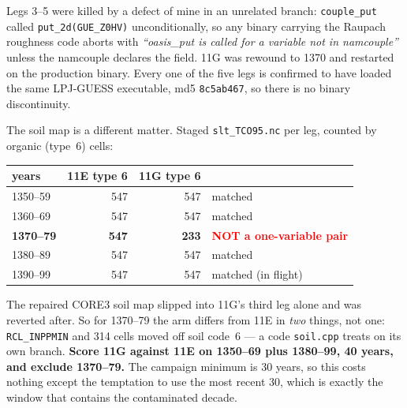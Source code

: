 \documentclass[10pt]{article}
\begin{document}
Legs 3--5 were killed by a defect of mine in an unrelated branch: \texttt{couple\_put}
called \texttt{put\_2d(GUE\_Z0HV)} unconditionally, so any binary carrying the Raupach
roughness code aborts with \emph{``oasis\_put is called for a variable not in
namcouple''} unless the namcouple declares the field. 11G was rewound to 1370 and
restarted on the production binary. Every one of the five legs is confirmed to have
loaded the same LPJ-GUESS executable, md5 \texttt{8c5ab467}, so there is no binary
discontinuity.

The soil map is a different matter. Staged \texttt{slt\_TCO95.nc} per leg, counted by
organic (type~6) cells:

\begin{center}\footnotesize
\begin{tabular}{l r r l}
\toprule
years & 11E type 6 & 11G type 6 & \\
\midrule
1350--59 & 547 & 547 & matched \\
1360--69 & 547 & 547 & matched \\
\textbf{1370--79} & \textbf{547} & \textbf{233} & \textcolor{red}{\textbf{NOT a one-variable pair}} \\
1380--89 & 547 & 547 & matched \\
1390--99 & 547 & 547 & matched (in flight) \\
\bottomrule
\end{tabular}
\end{center}

\noindent The repaired CORE3 soil map slipped into 11G's third leg alone and was reverted
after. So for 1370--79 the arm differs from 11E in \emph{two} things, not one:
\texttt{RCL\_INPPMIN} and 314 cells moved off soil code~6 --- a code \texttt{soil.cpp}
treats on its own branch. \textbf{Score 11G against 11E on 1350--69 plus 1380--99, 40
years, and exclude 1370--79.} The campaign minimum is 30 years, so this costs nothing
except the temptation to use the most recent 30, which is exactly the window that
contains the contaminated decade.
\end{document}
